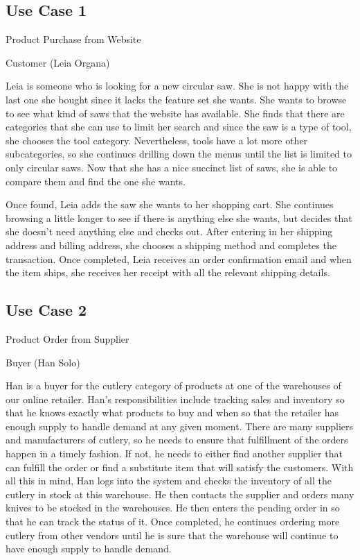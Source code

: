 \documentclass{article}
\begin{document}
\subsection{Use Case 1}
\begin{description}[font=\bfseries\itshape]
\item[Title:]Product Purchase from Website
\item[Actors:]Customer (Leia Organa)
\item[Description:]Leia is someone who is looking for a new circular saw.  She is not happy with the last one she bought since it lacks the feature set she wants.  She wants to browse to see what kind of saws that the website has available.  She finds that there are categories that she can use to limit her search and since the saw is a type of tool, she chooses the tool category.  Nevertheless, tools have a lot more other subcategories, so she continues drilling down the menus until the list is limited to only circular saws.  Now that she has a nice succinct list of saws, she is able to compare them and find the one she wants.

\hspace*{2em}Once found, Leia adds the saw she wants to her shopping cart.  She continues browsing a little longer to see if there is anything else she wants, but decides that she doesn't need anything else and checks out.  After entering in her shipping address and billing address, she chooses a shipping method and completes the transaction.  Once completed, Leia receives an order confirmation email and when the item ships, she receives her receipt with all the relevant shipping details.
\end{description}

\subsection{Use Case 2}
\begin{description}[font=\bfseries\itshape]
\item[Title:]Product Order from Supplier
\item[Actors:]Buyer (Han Solo)
\item[Description:]Han is a buyer for the cutlery category of products at one of the warehouses of our online retailer.  Han's responsibilities include tracking sales and inventory so that he knows exactly what products to buy and when so that the retailer has enough supply to handle demand at any given moment.  There are many suppliers and manufacturers of cutlery, so he needs to ensure that fulfillment of the orders happen in a timely fashion.  If not, he needs to either find another supplier that can fulfill the order or find a substitute item that will satisfy the customers.  With all this in mind, Han logs into the system and checks the inventory of all the cutlery in stock at this warehouse.  He then contacts the supplier and orders many knives to be stocked in the warehouses.  He then enters the pending order in so that he can track the status of it.  Once completed, he continues ordering more cutlery from other vendors until he is sure that the warehouse will continue to have enough supply to handle demand.
\end{description}
\end{document}
